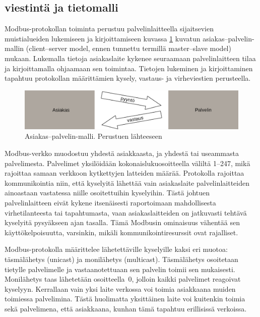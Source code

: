   \subsection{viestintä ja tietomalli}

  Modbus-protokollan toiminta perustuu palvelinlaitteella sijaitsevien muistialueiden lukemiseen ja kirjoittamiseen kuvassa \ref{fig:c_s} kuvatun asiakas--palvelin-mallin (client--server model, ennen tunnettu termillä master--slave model) mukaan.  Lukemalla tietoja asiakaslaite kykenee seuraamaan palvelinlaitteen tilaa ja kirjoittamalla ohjaamaan sen toimintaa. Tietojen lukeminen ja kirjoittaminen tapahtuu protokollan määrittämien kysely, vastaus- ja virheviestien perusteella. \parencite{modbusAppSpec}

  \begin{figure}[h]
    \centering
    \includegraphics[width=1\textwidth]{figures/client_server}
    \caption[asiakas--palvelin-malli]{Asiakas--palvelin-malli.  Perustuen lähteeseen \parencite{modbusAppSpec}}
    \label{fig:c_s}
  \end{figure}

  Modbus-verkko muodostuu yhdestä asiakkaasta, ja yhdestä tai useammasta palvelimesta. Palvelimet yksilöidään kokonaislukuosoitteella väliltä 1--247, mikä rajoittaa samaan verkkoon kytkettyjen latteiden määrää.  Protokolla rajoittaa kommunikointia niin, että kyselyitä lähettää vain asiakaslaite palvelinlaitteiden ainoastaan vastatessa niille osoitettuihin kyselyihin. \parencite{modbusSerialSpec} Tästä johtuen palvelinlaitteen eivät kykene itsenäisesti raportoimaan mahdollisesta virhetilanteesta tai tapahtumasta, vaan asiakaslaitteiden on jatkuvasti tehtävä kyselyitä pysyäkseen ajan tasalla. Tämä Modbusin ominaisuus vähentää sen käyttökelpoisuutta, varsinkin, mikäli kommunikointiresurssit ovat rajalliset.

  Modbus-protokolla määrittelee lähetettäville kyselyille kaksi eri muotoa: täsmälähetys (unicast) ja monilähetys (multicast). Täsmälähetys osoitetaan tietylle palvelimelle ja vastaanotettuaan sen palvelin toimii sen mukaisesti. Monilähetys taas lähetetään osoitteella~0, jolloin kaikki palvelimet reagoivat kyselyyn. \parencite{modbusSerialSpec} Kerrallaan vain yksi laite verkossa voi toimia asiakkaana muiden toimiessa palvelimina. Tästä huolimatta yksittäinen laite voi kuitenkin toimia sekä palvelimena, että asiakkaana, kunhan tämä tapahtuu erillisissä verkoissa. \parencite{DincerRosen}

